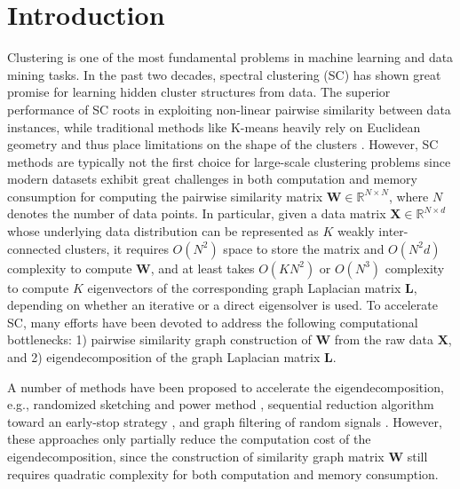 \documentclass[sigconf]{acmart}
\newcommand{\R}{\mathbb{R}}
\newcommand{\1}{\boldsymbol{1}}
\newcommand{\bX}{\mathbf{X}}
\newcommand{\bW}{\mathbf{W}}
\newcommand{\bL}{\mathbf{L}}
\newcommand{\0}{\boldsymbol{0}}
\begin{document}
\section{Introduction}
Clustering is one of the most fundamental problems in machine learning and data mining tasks. In the past two decades, spectral clustering (SC) \cite{shi2000normalized,ng2002spectral,von2007tutorial,chen2017revisiting} has shown great promise for learning hidden cluster structures from data. The superior performance of SC roots in exploiting non-linear pairwise similarity between data instances, while traditional methods like K-means heavily rely on Euclidean geometry and thus place limitations on the shape of the clusters \cite{fowlkes2004spectral,yan2009fast,chen2016phase}. However, SC methods are typically not the first choice for large-scale clustering problems since modern datasets exhibit great challenges in both computation and memory consumption for computing the pairwise similarity matrix $\bW \in \R^{N \times N}$, where $N$ denotes the number of data points. In particular, given a data matrix $\bX \in \R^{N \times d}$ whose underlying data distribution can be represented as  $K$ weakly inter-connected clusters, it requires $O(N^2)$ space to store the matrix and $O(N^2d)$ complexity to compute $\bW$, and at least takes $O(KN^2)$ or $O(N^3)$ complexity to compute $K$ eigenvectors of the corresponding graph Laplacian matrix $\bL$, depending on whether an iterative or a direct eigensolver is used. To accelerate SC, many efforts have been devoted to address the following computational bottlenecks: 1) pairwise similarity graph construction of $\bW$ from the raw data $\bX$, and 2) eigendecomposition of  the graph Laplacian matrix $\bL$. 

A number of methods have been proposed to accelerate the eigendecomposition, e.g.,  randomized sketching and power method \cite{gittens2013approximate,lin2010power},  sequential reduction algorithm toward an early-stop strategy \cite{chen2006fast,liu2007fast}, and graph filtering of random signals \cite{tremblay2016compressive}. However,  these approaches only partially reduce the computation cost of the eigendecomposition, since the construction of similarity graph matrix $\bW$ still requires quadratic complexity for both computation and memory consumption. 
\end{document}
